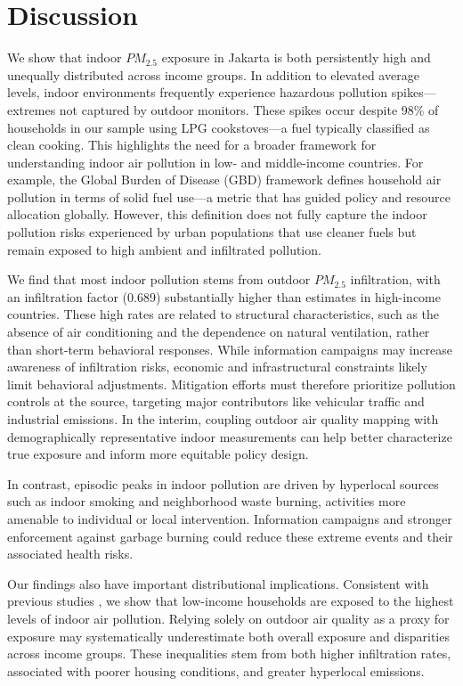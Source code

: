 \documentclass[9pt,twocolumn,twoside]{pnas-new}
\begin{document}
\section{Discussion}

We show that indoor $PM_{2.5}$ exposure in Jakarta is both persistently high and unequally distributed across income groups. In addition to elevated average levels, indoor environments frequently experience hazardous pollution spikes—extremes not captured by outdoor monitors. These spikes occur despite 98\% of households in our sample using LPG cookstoves—a fuel typically classified as clean cooking. This highlights the need for a broader framework for understanding indoor air pollution in low- and middle-income countries.
For example, the Global Burden of Disease (GBD) framework defines household air pollution in terms of solid fuel use—a metric that has guided policy and resource allocation globally. However, this definition does not fully capture the indoor pollution risks experienced by urban populations that use cleaner fuels but remain exposed to high ambient and infiltrated pollution. 

We find that most indoor pollution stems from outdoor $PM_{2.5}$ infiltration, with an infiltration factor (0.689) substantially higher than estimates in high-income countries. These high rates are related to structural characteristics, such as the absence of air conditioning and the dependence on natural ventilation, rather than short-term behavioral responses. While information campaigns may increase awareness of infiltration risks, economic and infrastructural constraints likely limit behavioral adjustments. Mitigation efforts must therefore prioritize  pollution controls at the source, targeting major contributors like vehicular traffic and industrial emissions. In the interim, coupling outdoor air quality mapping with demographically representative indoor measurements can help better characterize true exposure and inform more equitable policy design.


In contrast, episodic peaks in indoor pollution are driven by hyperlocal sources such as indoor smoking and neighborhood waste burning, activities more amenable to individual or local intervention. Information campaigns and stronger enforcement against garbage burning could reduce these extreme events and their associated health risks.


Our findings also have important distributional implications. Consistent with previous studies \citep{greenstone_indoor_2021, burke_exposures_2022, ito_willingness_2020}, we show that low-income households are exposed to the highest levels of indoor air pollution. Relying solely on outdoor air quality as a proxy for exposure may systematically underestimate both overall exposure and disparities across income groups. These inequalities stem from both higher infiltration rates, associated with poorer housing conditions, and greater hyperlocal emissions. 
\end{document}
